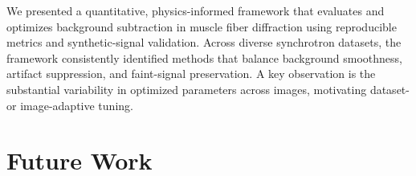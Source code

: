 \documentclass[iucr]{iucrjournals}
\begin{document}


We presented a quantitative, physics-informed framework that evaluates and optimizes background subtraction in muscle fiber diffraction using reproducible metrics and synthetic-signal validation. Across diverse synchrotron datasets, the framework consistently identified methods that balance background smoothness, artifact suppression, and faint-signal preservation. A key observation is the substantial variability in optimized parameters across images, motivating dataset- or image-adaptive tuning.





\section{Future Work}
\end{document}
